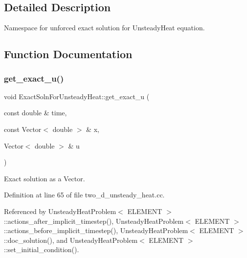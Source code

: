 \subsection{Detailed Description}
Namespace for unforced exact solution for Unsteady\+Heat equation. 

\subsection{Function Documentation}
\mbox{\label{namespaceExactSolnForUnsteadyHeat_a1d5b22857bd2a7825397daf1cf9c89eb}} 
\subsubsection{\texorpdfstring{get\+\_\+exact\+\_\+u()}{get\_exact\_u()}\hspace{0.1cm}{\footnotesize\ttfamily [1/2]}}
{\footnotesize\ttfamily void Exact\+Soln\+For\+Unsteady\+Heat\+::get\+\_\+exact\+\_\+u (\begin{DoxyParamCaption}\item[{const double \&}]{time,  }\item[{const Vector$<$ double $>$ \&}]{x,  }\item[{Vector$<$ double $>$ \&}]{u }\end{DoxyParamCaption})}



Exact solution as a Vector. 



Definition at line 65 of file two\+\_\+d\+\_\+unsteady\+\_\+heat.\+cc.



Referenced by Unsteady\+Heat\+Problem$<$ E\+L\+E\+M\+E\+N\+T $>$\+::actions\+\_\+after\+\_\+implicit\+\_\+timestep(), Unsteady\+Heat\+Problem$<$ E\+L\+E\+M\+E\+N\+T $>$\+::actions\+\_\+before\+\_\+implicit\+\_\+timestep(), Unsteady\+Heat\+Problem$<$ E\+L\+E\+M\+E\+N\+T $>$\+::doc\+\_\+solution(), and Unsteady\+Heat\+Problem$<$ E\+L\+E\+M\+E\+N\+T $>$\+::set\+\_\+initial\+\_\+condition().

\mbox{\label{namespaceExactSolnForUnsteadyHeat_a36e38a9c0c7c0bf8916e2d86ac75b4e2}} 
